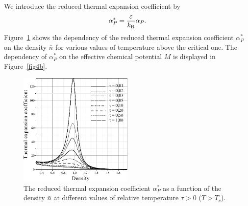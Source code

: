 \documentclass[12pt]{article}
\begin{document}
	We introduce the reduced thermal expansion coefficient by
	\begin{equation}
		\alpha^*_P = \frac{\varepsilon}{k_{\rm B}} \alpha_P.
	\end{equation}
	Figure~\ref{fig4a} shows the dependency of the reduced thermal expansion coefficient $\alpha^*_P$ on the density $\bar{n}$ for various values of temperature above the critical one. The dependency of $\alpha^*_P$ on the effective chemical potential $M$ is displayed in Figure~\ref{fig4b}.
	
	\begin{figure}[h!]
		\centering \includegraphics[width=0.5\textwidth]{f4a.pdf}
		\vskip-3mm\caption{The reduced thermal expansion coefficient $\alpha^*_P$ as a function of the density $\bar n$ at different values of relative temperature $\tau > 0$ ($T > T_c$). 
		}\label{fig4a}
	\end{figure}
	
\end{document}
